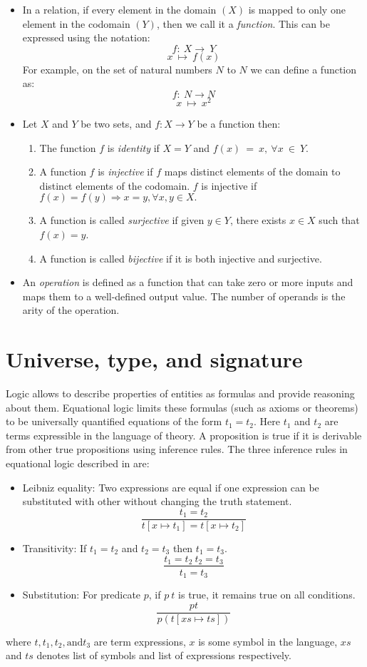 \begin{itemize}
\item In a relation, if every element in the domain $(X)$ is mapped to only one
element in the codomain $(Y)$, then we call it a \emph{function}. This can be
expressed using the notation:
\[f:\ X \rightarrow\ Y\]
\[x \ \mapsto\ f(x)\]
For example, on the set of natural numbers $N$ to $N$ we can define a function as:
\[f:\ N \rightarrow N\]
\[x \ \mapsto\ x^{2}\]   
\item Let $ X $ and $ Y $ be two sets, and $ f:X \rightarrow Y$ be a function then:
\begin{enumerate}
    \item The function $f$ is \textit{identity} if $X=Y$ and $f(x)\ =\ x,\
    \forall x\ \in \ Y$.
    \item A function $f$ is \emph{injective} if $f$ maps distinct elements of
    the domain to distinct elements of the codomain. $f$ is injective if
    $f(x)=f(y) \Rightarrow x = y, \forall x,y \in X.$
    \item A function is called \emph{surjective} if given $y \in Y$, there
    exists $x\in X$ such that $f(x) = y$.
    \item A function is called \emph{bijective} if it is both injective and
    surjective.
\end{enumerate}
\item An \emph{operation} is defined as a function that can take zero or more inputs
and maps them to a well-defined output value. The number of operands is the arity
of the operation.
\end{itemize}

\section{Universe, type, and signature}
Logic allows to describe properties of entities as formulas and provide
reasoning about them. Equational logic limits these formulas (such as axioms or
theorems) to  be universally quantified equations of the form $t_1 = t_2$. Here
$t_1$ and $t_2$ are terms expressible in the language of theory. A proposition
is true if it is derivable from other true propositions using inference rules.
The three inference rules in equational logic described in
\cite{gries2013logical} are:
\begin{itemize}
    \item Leibniz equality: Two expressions are equal if one expression can be
    substituted with other without changing the truth statement. \[\frac{t_1
    = t_2}{t[x \mapsto t_1] = t[x \mapsto t_2]}\]
    \item Transitivity: If $t_1 = t_2$ and $t_2 = t_3$ then $t_1 = t_3$.
    \[{\frac{t_1 = t_2\ t_2 = t_3}{t_1 = t_3}}\]
    \item Substitution: For predicate $p$, if $p\ t$ is true, it remains true on all
    conditions. \[\frac{p t}{p(t[xs \mapsto ts])}\]
\end{itemize}
where $t,t_1,t_2, \text{and} t_3$ are term expressions, $x$ is some symbol in the
language, $xs$ and $ts$ denotes list of symbols and list of expressions
respectively. 

